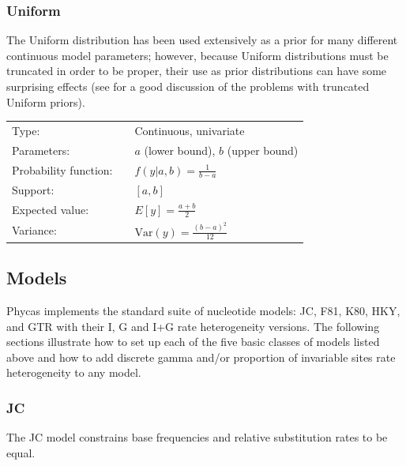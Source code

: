 \documentclass[10pt]{article}
\newcommand{\Var}{\mbox{Var}}
\begin{document}
\subsubsection{Uniform}

The Uniform distribution has been used extensively as a prior for many different continuous model parameters; however, because Uniform distributions must be truncated in order to be proper, their use as prior distributions can have some surprising effects (see \citet{Felsenstein2004} for a good discussion of the problems with truncated Uniform priors).

\begin{tabular}{lcl}
Type:                 & & Continuous, univariate \\
Parameters:           & & $a$ (lower bound), $b$ (upper bound)    \\
Probability function: & & $f(y|a,b) = \frac{1}{b-a}$ \\
Support:              & & $[a,b]$     \\
Expected value:       & & $E[y] = \frac{a + b}{2}$ \\
Variance:             & & $\Var(y) = \frac{(b - a)^2}{12}$ 
\end{tabular}

\subsection{Models}\label{subsec:models}

Phycas implements the standard suite of nucleotide models: JC, F81, K80, HKY, and GTR with their I, G and I+G rate heterogeneity versions. The following sections illustrate how to set up each of the five basic classes of models listed above and how to add discrete gamma and/or proportion of invariable sites rate heterogeneity to any model.

\subsubsection{JC}
The JC model \citep{JukesCantor1969} constrains base frequencies and relative substitution rates to be equal.
\end{document}
